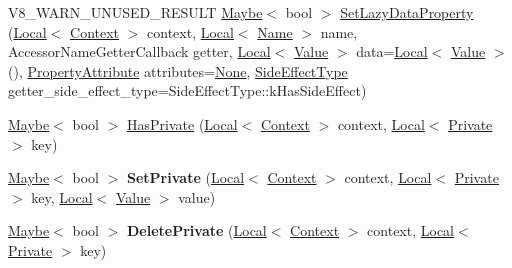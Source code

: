 \begin{DoxyCompactItemize}
\item 
V8\+\_\+\+W\+A\+R\+N\+\_\+\+U\+N\+U\+S\+E\+D\+\_\+\+R\+E\+S\+U\+LT \mbox{\hyperlink{classv8_1_1Maybe}{Maybe}}$<$ bool $>$ \mbox{\hyperlink{classv8_1_1Object_a607c24e5ffc2c1de1f0f793d75f3d650}{Set\+Lazy\+Data\+Property}} (\mbox{\hyperlink{classv8_1_1Local}{Local}}$<$ \mbox{\hyperlink{classv8_1_1Context}{Context}} $>$ context, \mbox{\hyperlink{classv8_1_1Local}{Local}}$<$ \mbox{\hyperlink{classv8_1_1Name}{Name}} $>$ name, Accessor\+Name\+Getter\+Callback getter, \mbox{\hyperlink{classv8_1_1Local}{Local}}$<$ \mbox{\hyperlink{classv8_1_1Value}{Value}} $>$ data=\mbox{\hyperlink{classv8_1_1Local}{Local}}$<$ \mbox{\hyperlink{classv8_1_1Value}{Value}} $>$(), \mbox{\hyperlink{namespacev8_a05f25f935e108a1ea2d150e274602b87}{Property\+Attribute}} attributes=\mbox{\hyperlink{namespacev8_a05f25f935e108a1ea2d150e274602b87a7ab4d58719c33b3ea2dfaefa29b111df}{None}}, \mbox{\hyperlink{namespacev8_a29711319c2b9fc7716d65faee2f7b9cb}{Side\+Effect\+Type}} getter\+\_\+side\+\_\+effect\+\_\+type=Side\+Effect\+Type\+::k\+Has\+Side\+Effect)
\item 
\mbox{\hyperlink{classv8_1_1Maybe}{Maybe}}$<$ bool $>$ \mbox{\hyperlink{classv8_1_1Object_aad699867935fd2142ec97afa6e39a7f0}{Has\+Private}} (\mbox{\hyperlink{classv8_1_1Local}{Local}}$<$ \mbox{\hyperlink{classv8_1_1Context}{Context}} $>$ context, \mbox{\hyperlink{classv8_1_1Local}{Local}}$<$ \mbox{\hyperlink{classv8_1_1Private}{Private}} $>$ key)
\item 
\mbox{\label{classv8_1_1Object_a6ebc49302a65e706c52eeca31ba83283}} 
\mbox{\hyperlink{classv8_1_1Maybe}{Maybe}}$<$ bool $>$ {\bfseries Set\+Private} (\mbox{\hyperlink{classv8_1_1Local}{Local}}$<$ \mbox{\hyperlink{classv8_1_1Context}{Context}} $>$ context, \mbox{\hyperlink{classv8_1_1Local}{Local}}$<$ \mbox{\hyperlink{classv8_1_1Private}{Private}} $>$ key, \mbox{\hyperlink{classv8_1_1Local}{Local}}$<$ \mbox{\hyperlink{classv8_1_1Value}{Value}} $>$ value)
\item 
\mbox{\label{classv8_1_1Object_ad78ba140348f92581361329aab917382}} 
\mbox{\hyperlink{classv8_1_1Maybe}{Maybe}}$<$ bool $>$ {\bfseries Delete\+Private} (\mbox{\hyperlink{classv8_1_1Local}{Local}}$<$ \mbox{\hyperlink{classv8_1_1Context}{Context}} $>$ context, \mbox{\hyperlink{classv8_1_1Local}{Local}}$<$ \mbox{\hyperlink{classv8_1_1Private}{Private}} $>$ key)
\item 
\mbox{\label{classv8_1_1Object_a6b2e55f1bf6b057c5cd9f2fc0e609c86}} 

\end{DoxyCompactItemize}
